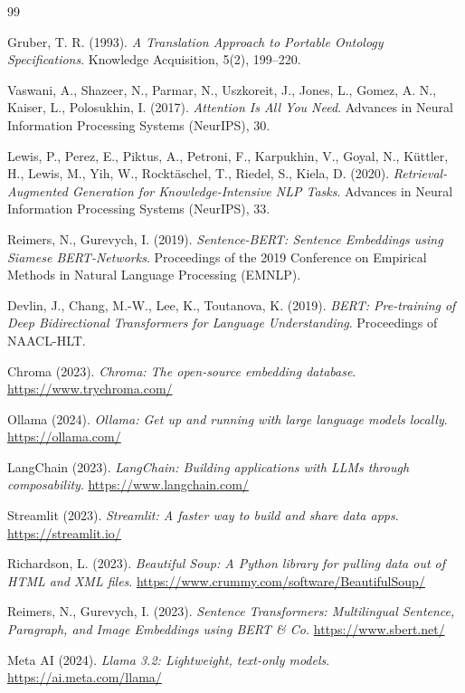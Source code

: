 \documentclass[12pt, a4paper, twoside]{report}
\begin{document}
\begin{thebibliography}{99}

Gruber, T. R. (1993).
\textit{A Translation Approach to Portable Ontology Specifications}.
Knowledge Acquisition, 5(2), 199--220.

Vaswani, A., Shazeer, N., Parmar, N., Uszkoreit, J., Jones, L., Gomez, A. N., Kaiser, L., Polosukhin, I. (2017).
\textit{Attention Is All You Need}.
Advances in Neural Information Processing Systems (NeurIPS), 30.

Lewis, P., Perez, E., Piktus, A., Petroni, F., Karpukhin, V., Goyal, N., K\"uttler, H., Lewis, M., Yih, W., Rockt\"aschel, T., Riedel, S., Kiela, D. (2020).
\textit{Retrieval-Augmented Generation for Knowledge-Intensive NLP Tasks}.
Advances in Neural Information Processing Systems (NeurIPS), 33.

Reimers, N., Gurevych, I. (2019).
\textit{Sentence-BERT: Sentence Embeddings using Siamese BERT-Networks}.
Proceedings of the 2019 Conference on Empirical Methods in Natural Language Processing (EMNLP).

Devlin, J., Chang, M.-W., Lee, K., Toutanova, K. (2019).
\textit{BERT: Pre-training of Deep Bidirectional Transformers for Language Understanding}.
Proceedings of NAACL-HLT.

Chroma (2023).
\textit{Chroma: The open-source embedding database}.
\url{https://www.trychroma.com/}

Ollama (2024).
\textit{Ollama: Get up and running with large language models locally}.
\url{https://ollama.com/}

LangChain (2023).
\textit{LangChain: Building applications with LLMs through composability}.
\url{https://www.langchain.com/}

Streamlit (2023).
\textit{Streamlit: A faster way to build and share data apps}.
\url{https://streamlit.io/}

Richardson, L. (2023).
\textit{Beautiful Soup: A Python library for pulling data out of HTML and XML files}.
\url{https://www.crummy.com/software/BeautifulSoup/}

Reimers, N., Gurevych, I. (2023).
\textit{Sentence Transformers: Multilingual Sentence, Paragraph, and Image Embeddings using BERT \& Co.}
\url{https://www.sbert.net/}

Meta AI (2024).
\textit{Llama 3.2: Lightweight, text-only models}.
\url{https://ai.meta.com/llama/}

\end{thebibliography}
\end{document}
